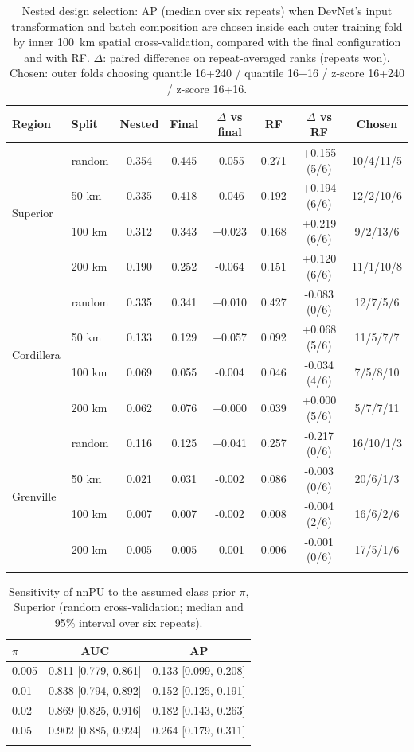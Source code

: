 \documentclass[pdflatex,sn-apa]{sn-jnl}
\begin{document}
\begin{appendices}
\begin{table}[!h]
\caption{Nested design selection: AP (median over six repeats) when DevNet's input transformation and batch composition are chosen inside each outer training fold by inner 100~km spatial cross-validation, compared with the final configuration and with RF. $\Delta$: paired difference on repeat-averaged ranks (repeats won). Chosen: outer folds choosing quantile 16+240 / quantile 16+16 / z-score 16+240 / z-score 16+16.}\label{tab:nested}
\scriptsize
\setlength{\tabcolsep}{2.5pt}
\begin{tabular*}{\textwidth}{@{\extracolsep\fill}llcccccc}
\toprule
Region & Split & Nested & Final & $\Delta$ vs final & RF & $\Delta$ vs RF & Chosen \\
\midrule
\multirow{4}{*}{Superior} & random & 0.354 & 0.445 & -0.055 & 0.271 & +0.155 (5/6) & 10/4/11/5 \\
 & 50 km & 0.335 & 0.418 & -0.046 & 0.192 & +0.194 (6/6) & 12/2/10/6 \\
 & 100 km & 0.312 & 0.343 & +0.023 & 0.168 & +0.219 (6/6) & 9/2/13/6 \\
 & 200 km & 0.190 & 0.252 & -0.064 & 0.151 & +0.120 (6/6) & 11/1/10/8 \\
\midrule
\multirow{4}{*}{Cordillera} & random & 0.335 & 0.341 & +0.010 & 0.427 & -0.083 (0/6) & 12/7/5/6 \\
 & 50 km & 0.133 & 0.129 & +0.057 & 0.092 & +0.068 (5/6) & 11/5/7/7 \\
 & 100 km & 0.069 & 0.055 & -0.004 & 0.046 & -0.034 (4/6) & 7/5/8/10 \\
 & 200 km & 0.062 & 0.076 & +0.000 & 0.039 & +0.000 (5/6) & 5/7/7/11 \\
\midrule
\multirow{4}{*}{Grenville} & random & 0.116 & 0.125 & +0.041 & 0.257 & -0.217 (0/6) & 16/10/1/3 \\
 & 50 km & 0.021 & 0.031 & -0.002 & 0.086 & -0.003 (0/6) & 20/6/1/3 \\
 & 100 km & 0.007 & 0.007 & -0.002 & 0.008 & -0.004 (2/6) & 16/6/2/6 \\
 & 200 km & 0.005 & 0.005 & -0.001 & 0.006 & -0.001 (0/6) & 17/5/1/6 \\
\botrule
\end{tabular*}
\end{table}

\begin{table}[!h]
\caption{Sensitivity of nnPU to the assumed class prior $\pi$, Superior (random cross-validation; median and 95\% interval over six repeats).}\label{tab:prior}
\footnotesize
\begin{tabular*}{0.6\textwidth}{@{\extracolsep\fill}lcc}
\toprule
$\pi$ & AUC & AP \\
\midrule
0.005 & 0.811 [0.779, 0.861] & 0.133 [0.099, 0.208] \\
0.01 & 0.838 [0.794, 0.892] & 0.152 [0.125, 0.191] \\
0.02 & 0.869 [0.825, 0.916] & 0.182 [0.143, 0.263] \\
0.05 & 0.902 [0.885, 0.924] & 0.264 [0.179, 0.311] \\
\botrule
\end{tabular*}
\end{table}


\end{appendices}
\end{document}
